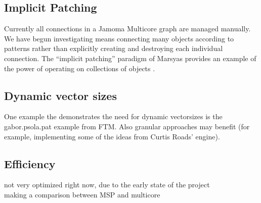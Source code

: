 \documentclass[twoside,a4paper]{article}
\begin{document}


\subsection{Implicit Patching} %

Currently all connections in a Jamoma Multicore graph are managed manually.  
We have begun investigating means connecting many objects according to patterns rather than explicitly creating and destroying each individual connection.  
The ``implicit patching'' paradigm of Marsyas provides an example of the power of operating on collections of objects \cite{Bray:2005}.





\subsection{Dynamic vector sizes} %

One example the demonstrates the need for dynamic vectorsizes is the gabor.psola.pat example from FTM. 
Also granular approaches may benefit (for example, implementing some of the ideas from Curtis Roads' engine).


\subsection{Efficiency}
not very optimized right now, due to the early state of the project\\

making a comparison between MSP and multicore
\end{document}
